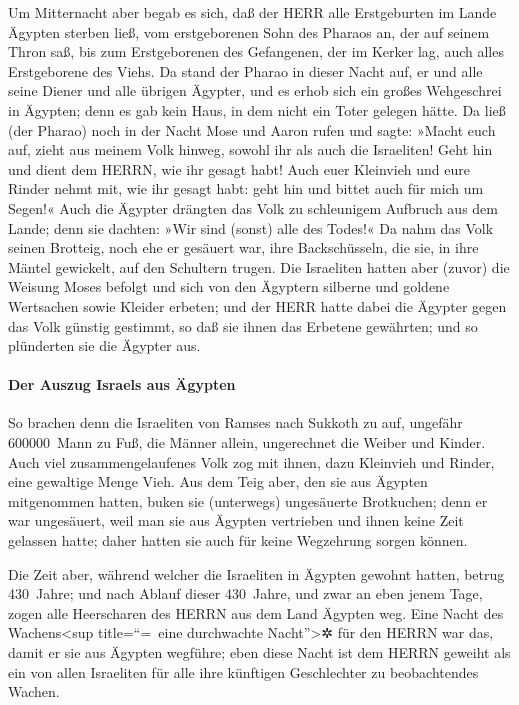  Um Mitternacht aber begab es sich, daß der HERR alle
Erstgeburten im Lande Ägypten sterben ließ, vom erstgeborenen Sohn des
Pharaos an, der auf seinem Thron saß, bis zum Erstgeborenen des
Gefangenen, der im Kerker lag, auch alles Erstgeborene des Viehs.
 Da stand der Pharao in dieser Nacht auf, er und alle
seine Diener und alle übrigen Ägypter, und es erhob sich ein großes
Wehgeschrei in Ägypten; denn es gab kein Haus, in dem nicht ein Toter
gelegen hätte.  Da ließ (der Pharao) noch in der Nacht
Mose und Aaron rufen und sagte: »Macht euch auf, zieht aus meinem Volk
hinweg, sowohl ihr als auch die Israeliten! Geht hin und dient dem
HERRN, wie ihr gesagt habt!  Auch euer Kleinvieh und eure
Rinder nehmt mit, wie ihr gesagt habt: geht hin und bittet auch für mich
um Segen!«  Auch die Ägypter drängten das Volk zu
schleunigem Aufbruch aus dem Lande; denn sie dachten: »Wir sind (sonst)
alle des Todes!«  Da nahm das Volk seinen Brotteig, noch
ehe er gesäuert war, ihre Backschüsseln, die sie, in ihre Mäntel
gewickelt, auf den Schultern trugen.  Die Israeliten
hatten aber (zuvor) die Weisung Moses befolgt und sich von den Ägyptern
silberne und goldene Wertsachen sowie Kleider erbeten; 
und der HERR hatte dabei die Ägypter gegen das Volk günstig gestimmt, so
daß sie ihnen das Erbetene gewährten; und so plünderten sie die Ägypter
aus.

\hypertarget{der-auszug-israels-aus-uxe4gypten}{%
\paragraph{Der Auszug Israels aus
Ägypten}\label{der-auszug-israels-aus-uxe4gypten}}

 So brachen denn die Israeliten von Ramses nach Sukkoth
zu auf, ungefähr 600000~Mann zu Fuß, die Männer allein, ungerechnet die
Weiber und Kinder.  Auch viel zusammengelaufenes Volk zog
mit ihnen, dazu Kleinvieh und Rinder, eine gewaltige Menge Vieh.
 Aus dem Teig aber, den sie aus Ägypten mitgenommen
hatten, buken sie (unterwegs) ungesäuerte Brotkuchen; denn er war
ungesäuert, weil man sie aus Ägypten vertrieben und ihnen keine Zeit
gelassen hatte; daher hatten sie auch für keine Wegzehrung sorgen
können.

 Die Zeit aber, während welcher die Israeliten in Ägypten
gewohnt hatten, betrug 430~Jahre;  und nach Ablauf dieser
430~Jahre, und zwar an eben jenem Tage, zogen alle Heerscharen des HERRN
aus dem Land Ägypten weg.  Eine Nacht des
Wachens\textless sup title=``=~eine durchwachte Nacht''\textgreater✲ für
den HERRN war das, damit er sie aus Ägypten wegführe; eben diese Nacht
ist dem HERRN geweiht als ein von allen Israeliten für alle ihre
künftigen Geschlechter zu beobachtendes Wachen.

